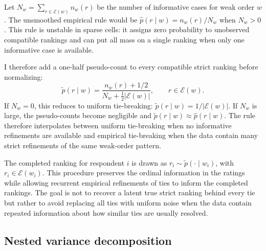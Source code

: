 \documentclass[12pt]{article}
\begin{document}
Let \(N_w=\sum_{r\in\mathcal E(w)}n_w(r)\) be the number of informative cases
for weak order \(w\). The unsmoothed empirical rule would be
\(\widehat p(r\mid w)=n_w(r)/N_w\) when \(N_w>0\). This rule is unstable in
sparse cells: it assigns zero probability to unobserved compatible rankings
and can put all mass on a single ranking when only one informative case is
available.

I therefore add a one-half pseudo-count to every compatible strict ranking
before normalizing:
\[
\widetilde p(r\mid w)
=
\frac{n_w(r)+1/2}{N_w+\frac12|\mathcal E(w)|},
\qquad r\in\mathcal E(w).
\]
If \(N_w=0\), this reduces to uniform tie-breaking:
\(\widetilde p(r\mid w)=1/|\mathcal E(w)|\). If \(N_w\) is large, the
pseudo-counts become negligible and \(\widetilde p(r\mid w)\approx
\widehat p(r\mid w)\). The rule therefore interpolates between uniform
tie-breaking when no informative refinements are available and empirical
tie-breaking when the data contain many strict refinements of the same
weak-order pattern.

The completed ranking for respondent \(i\) is drawn as
\(r_i\sim\widetilde p(\cdot\mid w_i)\), with \(r_i\in\mathcal E(w_i)\). This procedure
preserves the ordinal information in the ratings while allowing recurrent
empirical refinements of ties to inform the completed rankings. The goal is not
to recover a latent true strict ranking behind every tie but rather to avoid
replacing all ties with uniform noise when the data contain repeated information
about how similar ties are usually resolved.


\subsection{Nested variance decomposition}
\label{app:nested-variance-decomposition}
\end{document}
